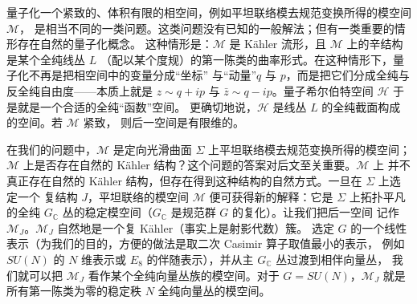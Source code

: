 \documentclass[11pt,a4paper]{article}
\begin{document}
量子化一个紧致的、体积有限的相空间，例如平坦联络模去规范变换所得的模空间 $\mathcal{M}$，
是相当不同的一类问题。这类问题没有已知的一般解法；但有一类重要的情形存在自然的量子化概念。
这种情形是：$\mathcal{M}$ 是 Kähler 流形，且 $\mathcal{M}$ 上的辛结构是某个全纯线丛 $L$
（配以某个度规）的第一陈类的曲率形式。在这种情形下，量子化不再是把相空间中的变量分成“坐标”
与“动量”$q$ 与 $p$，而是把它们分成全纯与反全纯自由度——本质上就是 $z\sim q+ip$ 与
$\bar z\sim q-ip$。量子希尔伯特空间 $\mathcal{H}$ 于是就是一个合适的全纯“函数”空间。
更确切地说，$\mathcal{H}$ 是线丛 $L$ 的全纯截面构成的空间。若 $\mathcal{M}$ 紧致，
则后一空间是有限维的。


在我们的问题中，$\mathcal{M}$ 是定向光滑曲面 $\Sigma$ 上平坦联络模去规范变换所得的模空间；
$\mathcal{M}$ 上是否存在自然的 Kähler 结构？这个问题的答案对后文至关重要。$\mathcal{M}$ 上
并不真正存在自然的 Kähler 结构，但存在得到这种结构的自然方式。一旦在 $\Sigma$ 上选定一个
复结构 $J$，平坦联络的模空间 $\mathcal{M}$ 便可获得新的解释：它是 $\Sigma$ 上拓扑平凡的全纯
$G_{\mathbb{C}}$ 丛的稳定模空间（$G_{\mathbb{C}}$ 是规范群 $G$ 的复化）。让我们把后一空间
记作 $\mathcal{M}_J$。$\mathcal{M}_J$ 自然地是一个复 Kähler（事实上是射影代数）簇。
选定 $G$ 的一个线性表示（为我们的目的，方便的做法是取二次 Casimir 算子取值最小的表示，
例如 $SU(N)$ 的 $N$ 维表示或 $E_8$ 的伴随表示），并从主 $G_{\mathbb{C}}$ 丛过渡到相伴向量丛，
我们就可以把 $\mathcal{M}_J$ 看作某个全纯向量丛族的模空间。对于 $G=SU(N)$，$\mathcal{M}_J$
就是所有第一陈类为零的稳定秩 $N$ 全纯向量丛的模空间。
\end{document}
